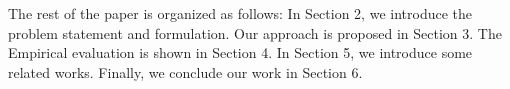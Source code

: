 The rest of the paper is organized as follows: In Section 2, we introduce the problem
statement and formulation. Our approach is proposed in Section 3. The Empirical evaluation is shown in Section 4. In Section 5, we introduce some
related works. Finally, we conclude our work in Section 6.



